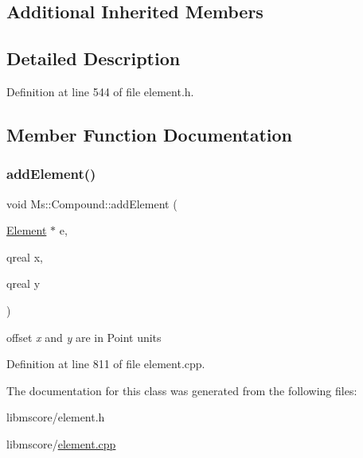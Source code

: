 \subsection*{Additional Inherited Members}


\subsection{Detailed Description}


Definition at line 544 of file element.\+h.



\subsection{Member Function Documentation}
\mbox{\label{class_ms_1_1_compound_a4287650988d7130a7e38414ba714b5ea}} 
\subsubsection{\texorpdfstring{add\+Element()}{addElement()}}
{\footnotesize\ttfamily void Ms\+::\+Compound\+::add\+Element (\begin{DoxyParamCaption}\item[{\hyperlink{class_ms_1_1_element}{Element} $\ast$}]{e,  }\item[{qreal}]{x,  }\item[{qreal}]{y }\end{DoxyParamCaption})\hspace{0.3cm}{\ttfamily [virtual]}}

offset {\itshape x} and {\itshape y} are in Point units 

Definition at line 811 of file element.\+cpp.



The documentation for this class was generated from the following files\+:\begin{DoxyCompactItemize}
\item 
libmscore/element.\+h\item 
libmscore/\hyperlink{element_8cpp}{element.\+cpp}\end{DoxyCompactItemize}
